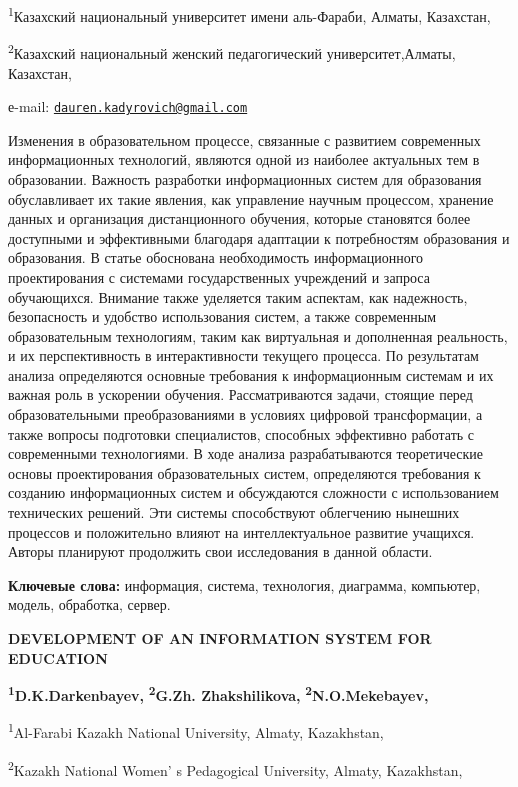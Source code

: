\textsuperscript{1}Казахский национальный университет имени аль-Фараби,
Алматы, Казахстан,

\textsuperscript{2}Казахский национальный женский педагогический
университет,Алматы, Казахстан,

е-mail:
\href{mailto:dauren.kadyrovich@gmail.com}{\nolinkurl{dauren.kadyrovich@gmail.com}}

Изменения в образовательном процессе, связанные с развитием современных
информационных технологий, являются одной из наиболее актуальных тем в
образовании. Важность разработки информационных систем для образования
обуславливает их такие явления, как управление научным процессом,
хранение данных и организация дистанционного обучения, которые
становятся более доступными и эффективными благодаря адаптации к
потребностям образования и образования. В статье обоснована
необходимость информационного проектирования с системами государственных
учреждений и запроса обучающихся. Внимание также уделяется таким
аспектам, как надежность, безопасность и удобство использования систем,
а также современным образовательным технологиям, таким как виртуальная и
дополненная реальность, и их перспективность в интерактивности текущего
процесса. По результатам анализа определяются основные требования к
информационным системам и их важная роль в ускорении обучения.
Рассматриваются задачи, стоящие перед образовательными преобразованиями
в условиях цифровой трансформации, а также вопросы подготовки
специалистов, способных эффективно работать с современными технологиями.
В ходе анализа разрабатываются теоретические основы проектирования
образовательных систем, определяются требования к созданию
информационных систем и обсуждаются сложности с использованием
технических решений. Эти системы способствуют облегчению нынешних
процессов и положительно влияют на интеллектуальное развитие учащихся.
Авторы планируют продолжить свои исследования в данной области.

{\bfseries Ключевые слова:} информация, система, технология, диаграмма,
компьютер, модель, обработка, сервер.

{\bfseries DEVELOPMENT OF AN INFORMATION SYSTEM FOR EDUCATION}

{\bfseries \textsuperscript{1}D.K.Darkenbayev\textsuperscript{\envelope },}
{\bfseries \textsuperscript{2}G.Zh. Zhakshilikova,}
{\bfseries \textsuperscript{2}N.O.Mekebayev,}

\textsuperscript{1}Al-Farabi Kazakh National University, Almaty,
Kazakhstan,

\textsuperscript{2}Kazakh National Women' s Pedagogical
University, Almaty, Kazakhstan,

